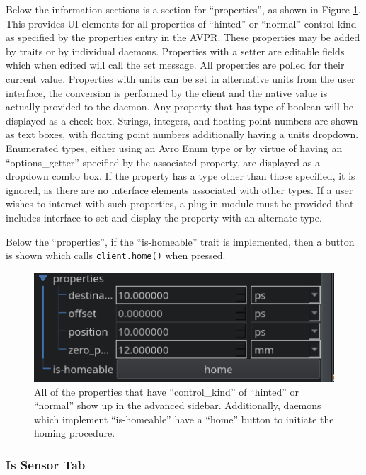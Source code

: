 Below the information sections is a section for ``properties'', as shown in Figure \ref{yaq:fig:has_position_properties}.
This provides UI elements for all properties of ``hinted'' or ``normal'' control kind as specified by the properties entry in the AVPR.
These properties may be added by traits or by individual daemons.
Properties with a setter are editable fields which when edited will call the set message.
All properties are polled for their current value.
Properties with units can be set in alternative units from the user interface, the conversion is performed by the client and the native value is actually provided to the daemon.
Any property that has type of boolean will be displayed as a check box.
Strings, integers, and floating point numbers are shown as text boxes, with floating point numbers additionally having a units dropdown.
Enumerated types, either using an Avro Enum type or by virtue of having an ``options\_getter'' specified by the associated property, are displayed as a dropdown combo box.
If the property has a type other than those specified, it is ignored, as there are no interface elements associated with other types.
If a user wishes to interact with such properties, a plug-in module must be provided that includes interface to set and display the property with an alternate type.

Below the ``properties'', if the ``is-homeable'' trait is implemented, then a button is shown which calls \texttt{client.home()} when pressed.

\begin{figure}
\includegraphics[width=4.5in]{"yaq/images/has_position_properties"}
\caption[\yaqcqtpy{} Properties]{
	All of the properties that have ``control\_kind'' of ``hinted'' or ``normal'' show up in the advanced sidebar.
	Additionally, daemons which implement ``is-homeable'' have a ``home'' button to initiate the homing procedure.
}
\label{yaq:fig:has_position_properties}
\end{figure}

\subsubsection{Is Sensor Tab}

